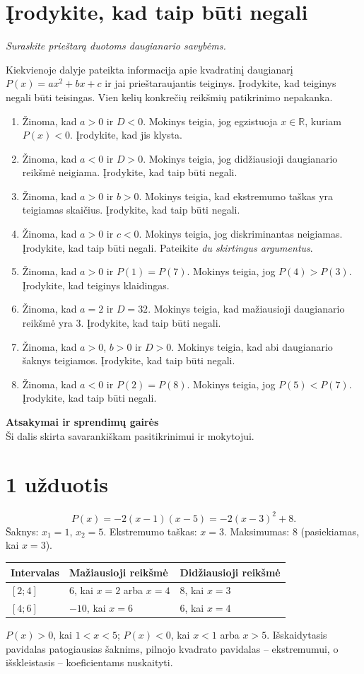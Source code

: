 \documentclass[11pt,a4paper]{article}
\newcommand{\R}{\mathbb{R}}
\newcommand{\uzd}[2]{\needspace{7\baselineskip}\section{#1}\textit{#2}\par\smallskip}
\begin{document}
\uzd{Įrodykite, kad taip būti negali}{Suraskite prieštarą duotoms daugianario savybėms.}
Kiekvienoje dalyje pateikta informacija apie kvadratinį daugianarį
$P(x)=ax^2+bx+c$ ir jai prieštaraujantis teiginys. Įrodykite, kad
 teiginys negali būti teisingas. Vien kelių konkrečių reikšmių patikrinimo nepakanka.
\begin{enumerate}
\item Žinoma, kad $a>0$ ir $D<0$.
 Mokinys teigia, jog egzistuoja $x\in\R$, kuriam $P(x)<0$.
 Įrodykite, kad jis klysta.
\item Žinoma, kad $a<0$ ir $D>0$.
 Mokinys teigia, jog didžiausioji daugianario reikšmė neigiama.
 Įrodykite, kad taip būti negali.
\item Žinoma, kad $a>0$ ir $b>0$.
 Mokinys teigia, kad ekstremumo taškas yra teigiamas skaičius.
 Įrodykite, kad taip būti negali.
\item Žinoma, kad $a>0$ ir $c<0$.
 Mokinys teigia, jog diskriminantas neigiamas.
 Įrodykite, kad taip būti negali. Pateikite \emph{du skirtingus argumentus}.
\item Žinoma, kad $a>0$ ir $P(1)=P(7)$.
 Mokinys teigia, jog $P(4)>P(3)$.
 Įrodykite, kad teiginys klaidingas.
\item Žinoma, kad $a=2$ ir $D=32$.
 Mokinys teigia, kad mažiausioji daugianario reikšmė yra $3$.
 Įrodykite, kad taip būti negali.
\item Žinoma, kad $a>0$, $b>0$ ir $D>0$.
 Mokinys teigia, kad abi daugianario šaknys teigiamos.
 Įrodykite, kad taip būti negali.
\item Žinoma, kad $a<0$ ir $P(2)=P(8)$.
 Mokinys teigia, jog $P(5)<P(7)$.
 Įrodykite, kad taip būti negali.
\end{enumerate}

\clearpage
\begin{center}
{\LARGE\bfseries\color{mainblue} Atsakymai ir sprendimų gairės}\\[3pt]
{\small Ši dalis skirta savarankiškam pasitikrinimui ir mokytojui.}
\end{center}
\vspace{8pt}

\section*{1 užduotis}
\[
P(x)=-2(x-1)(x-5)=-2(x-3)^2+8.
\]
Šaknys: $x_1=1$, $x_2=5$. Ekstremumo taškas: $x=3$.
 Maksimumas: $8$ (pasiekiamas, kai $x=3$).
\begin{center}
\begin{tabular}{@{}lll@{}}
\toprule
Intervalas & Mažiausioji reikšmė & Didžiausioji reikšmė \\
\midrule
$[2;4]$ & $6$, kai $x=2$ arba $x=4$ & $8$, kai $x=3$ \\
$[4;6]$ & $-10$, kai $x=6$ & $6$, kai $x=4$ \\
\bottomrule
\end{tabular}
\end{center}
$P(x)>0$, kai $1<x<5$; $P(x)<0$, kai $x<1$ arba $x>5$.
 Išskaidytasis pavidalas patogiausias šaknims, pilnojo kvadrato pavidalas --
 ekstremumui, o išskleistasis -- koeficientams nuskaityti.
\end{document}
